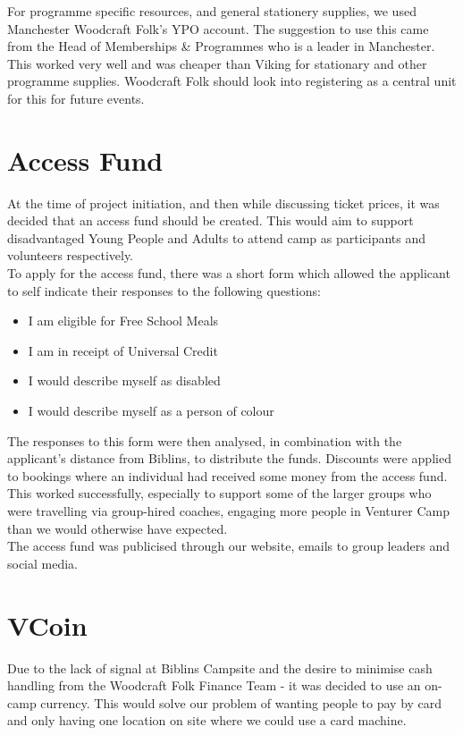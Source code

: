 For programme specific resources, and general stationery supplies, we used Manchester Woodcraft Folk's YPO account. The suggestion to use this came from the Head of Memberships \& Programmes who is a leader in Manchester. This worked very well and was cheaper than Viking for stationary and other programme supplies. Woodcraft Folk should look into registering as a central unit for this for future events. 

\section{Access Fund}
At the time of project initiation, and then while discussing ticket prices, it was decided that an access fund should be created. This would aim to support disadvantaged Young People and Adults to attend camp as participants and volunteers respectively.\\

To apply for the access fund, there was a short form which allowed the applicant to self indicate their responses to the following questions:
\begin{itemize}
    \item I am eligible for Free School Meals
    \item I am in receipt of Universal Credit
    \item I would describe myself as disabled
    \item I would describe myself as a person of colour
\end{itemize}
The responses to this form were then analysed, in combination with the applicant's distance from Biblins, to distribute the funds. Discounts were applied to bookings where an individual had received some money from the access fund.\\

This worked successfully, especially to support some of the larger groups who were travelling via group-hired coaches, engaging more people in Venturer Camp than we would otherwise have expected.\\

The access fund was publicised through our website, emails to group leaders and social media.

\section{VCoin}
Due to the lack of signal at Biblins Campsite and the desire to minimise cash handling from the Woodcraft Folk Finance Team - it was decided to use an on-camp currency. This would solve our problem of wanting people to pay by card and only having one location on site where we could use a card machine.\\

